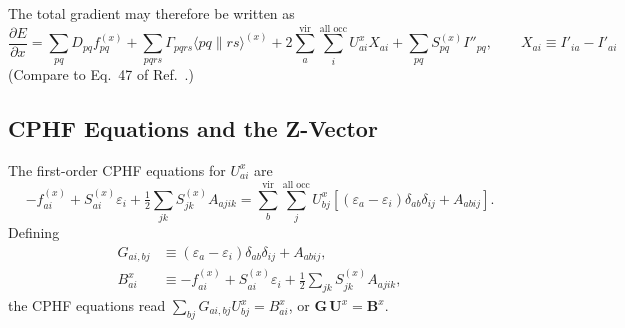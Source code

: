 \documentclass[12pt]{article}
\newcommand{\adb}[2]{\langle #1 \| #2 \rangle}
\newcommand{\vir}{\text{vir}}
\newcommand{\alloc}{\text{all occ}}   %
\begin{document}
\noindent
The total gradient may therefore be written as
\begin{equation}
\frac{\partial E}{\partial x}
= \sum_{pq} D_{pq} f^{(x)}_{pq}
+ \sum_{pqrs}\Gamma_{pqrs}\adb{pq}{rs}^{(x)}
+ 2\sum_{a}^{\vir}\sum_{i}^{\alloc} U^x_{ai} X_{ai}
+ \sum_{pq} S^{(x)}_{pq} I''_{pq},
\qquad X_{ai} \equiv I'_{ia} - I'_{ai}
\label{eq:grad-U}
\end{equation}
(Compare to Eq.~47 of Ref.~.)

\subsection{CPHF Equations and the Z-Vector}
\label{sec:cphf-z}

The first-order CPHF equations for $U^x_{ai}$ are
\begin{equation}
-f^{(x)}_{ai} + S^{(x)}_{ai}\varepsilon_i
+ \tfrac{1}{2}\sum_{jk} S^{(x)}_{jk}A_{ajik}
= \sum_{b}^{\vir}\sum_{j}^{\alloc} U^x_{bj}
\left[(\varepsilon_a-\varepsilon_i)\delta_{ab}\delta_{ij} + A_{abij}\right].
\end{equation}
Defining
\begin{align}
G_{ai,bj} &\equiv (\varepsilon_a-\varepsilon_i)\delta_{ab}\delta_{ij} + A_{abij},\\
B^x_{ai} &\equiv -f^{(x)}_{ai} + S^{(x)}_{ai}\varepsilon_i
+ \tfrac{1}{2}\sum_{jk} S^{(x)}_{jk}A_{ajik},
\end{align}
the CPHF equations read $\sum_{bj} G_{ai,bj} U^x_{bj} = B^x_{ai}$, or
$\mathbf{G}\,\mathbf{U}^{x} = \mathbf{B}^{x}$.
\end{document}
